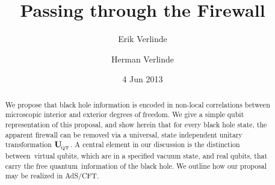 \documentclass[12pt,aps,prd,onecolumn,nofootinbib,superscriptaddress,amssymb]{revtex4-1}
\def\be{\begin{equation}}
\def\ee{\end{equation}}
\begin{document}
\title{Passing through the Firewall}

\author{Erik Verlinde}


\def\spc{\hspace{.5pt}}


\author{Herman Verlinde}

\date{4 Jun 2013}

\begin{abstract}

We propose that black hole information is encoded in non-local correlations
between microscopic interior and exterior degrees of freedom. 
We give a simple qubit representation of this proposal, and show herein that for every black hole state, the apparent firewall can be removed 
via a universal, state independent unitary transformation ${\bf U}_{{\! }_{\rm QT}}$.  
A central element in our discussion is the distinction between~virtual qubits, which are in a specified vacuum state, and real qubits, that carry the free quantum~information of the black hole. We outline how our proposal may be realized in AdS/CFT.


\end{abstract}


\def\be{\begin{equation}}
\def\ee{\end{equation}}
\maketitle
\def\mathbi#1{\textbf{\em #1}} 
\def\la{\langle}
\def\bea{\begin{eqnarray}}
\def\eea{\end{eqnarray}}
\def\is{\! & \! = \! & \!}
\def\half{{\textstyle{\frac 12}}}

\def\ba{\begin{eqnarray}}
\def\ea{\end{eqnarray}}
\end{document}
